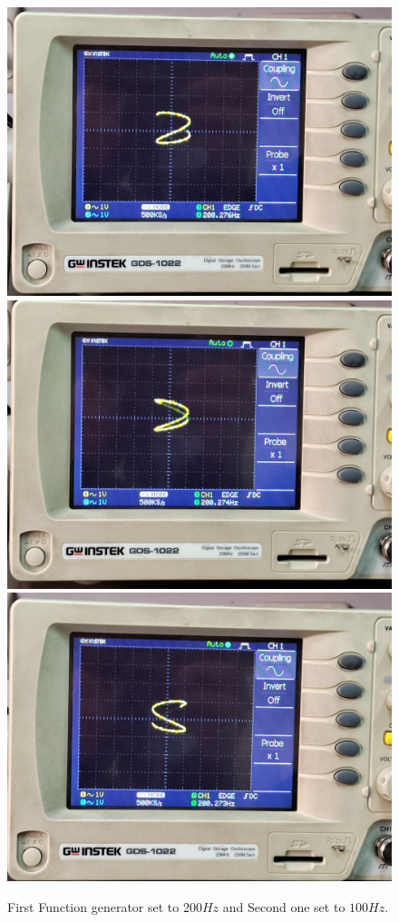 \documentclass[11pt]{article}
\begin{document}
\begin{question}
{        \begin{figure}[H]
            \begin{center}
                \includegraphics[scale=0.1]{Fig/62.jpeg}
                \includegraphics[scale=0.1]{Fig/63.jpeg}
                \includegraphics[scale=0.1]{Fig/64.jpeg}
                \caption{First Function generator set to $200Hz$ and Second one set to $100Hz$.}
            \end{center}
        \end{figure}

}
\end{question}
\end{document}
